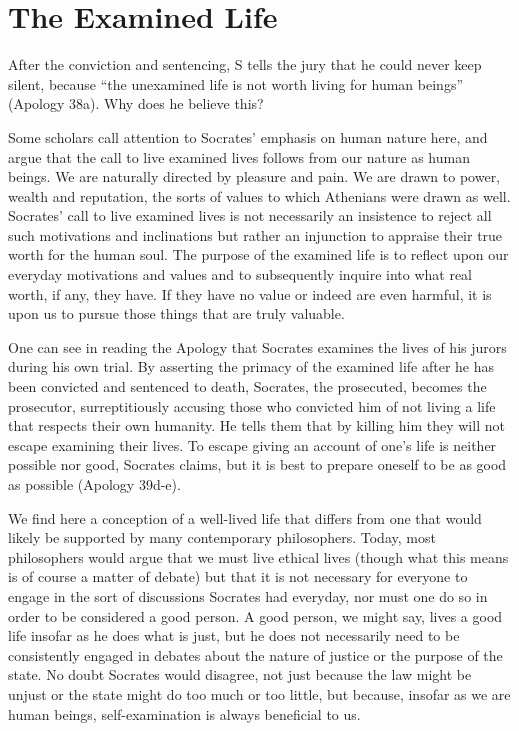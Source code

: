\documentclass[oneside]{article}
\begin{document}
\section*{The Examined Life}

After the conviction and sentencing, S tells the jury that he could never keep silent, because “the unexamined life is not worth living for human beings” (Apology 38a). Why does he believe this? 



Some scholars call attention to Socrates’ emphasis on human nature here, and argue that the call to live examined lives follows from our nature as human beings.  We are naturally directed by pleasure and pain.  We are drawn to power, wealth and reputation, the sorts of values to which Athenians were drawn as well.  Socrates’ call to live examined lives is not necessarily an insistence to reject all such motivations and inclinations but rather an injunction to appraise their true worth for the human soul.  The purpose of the examined life is to reflect upon our everyday motivations and values and to subsequently inquire into what real worth, if any, they have.  If they have no value or indeed are even harmful, it is upon us to pursue those things that are truly valuable.

One can see in reading the Apology that Socrates examines the lives of his jurors during his own trial.  By asserting the primacy of the examined life after he has been convicted and sentenced to death, Socrates, the prosecuted, becomes the prosecutor, surreptitiously accusing those who convicted him of not living a life that respects their own humanity.  He tells them that by killing him they will not escape examining their lives.  To escape giving an account of one’s life is neither possible nor good, Socrates claims, but it is best to prepare oneself to be as good as possible (Apology 39d-e).

We find here a conception of a well-lived life that differs from one that would likely be supported by many contemporary philosophers.  Today, most philosophers would argue that we must live ethical lives (though what this means is of course a matter of debate) but that it is not necessary for everyone to engage in the sort of discussions Socrates had everyday, nor must one do so in order to be considered a good person.  A good person, we might say, lives a good life insofar as he does what is just, but he does not necessarily need to be consistently engaged in debates about the nature of justice or the purpose of the state.  No doubt Socrates would disagree, not just because the law might be unjust or the state might do too much or too little, but because, insofar as we are human beings, self-examination is always beneficial to us.
\end{document}
